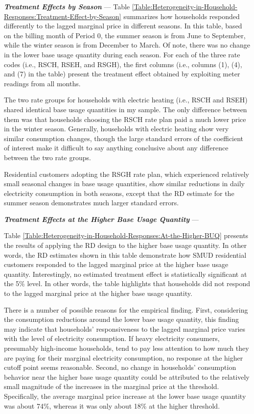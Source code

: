 \noindent
\textit{\textbf{Treatment Effects by Season}} --- 
Table \ref{Table:Heterogeneity-in-Household-Responses:Treatment-Effect-by-Season} summarizes how households responded differently to the lagged marginal price in different seasons. In this table, based on the billing month of Period 0, the summer season is from June to September, while the winter season is from December to March. Of note, there was no change in the lower base usage quantity during each season. For each of the three rate codes (i.e., RSCH, RSEH, and RSGH), the first columns (i.e., columns (1), (4), and (7) in the table) present the treatment effect obtained by exploiting meter readings from all months. 

The two rate groups for households with electric heating (i.e., RSCH and RSEH) shared identical base usage quantities in my sample. The only difference between them was that households choosing the RSCH rate plan paid a much lower price in the winter season. Generally, households with electric heating show very similar consumption changes, though the large standard errors of the coefficient of interest make it difficult to say anything conclusive about any difference between the two rate groups. 

Residential customers adopting the RSGH rate plan, which experienced relatively small seasonal changes in base usage quantities, show similar reductions in daily electricity consumption in both seasons, except that the RD estimate for the summer season demonstrates much larger standard errors. 


\par \vspace{0.5cm}
\noindent
\textit{\textbf{Treatment Effects at the Higher Base Usage Quantity}} ---

Table \ref{Table:Heterogeneity-in-Household-Responses:At-the-Higher-BUQ} presents the results of applying the RD design to the higher base usage quantity. In other words, the RD estimates shown in this table demonstrate how SMUD residential customers responded to the lagged marginal price at the higher base usage quantity. Interestingly, no estimated treatment effect is statistically significant at the 5\% level. In other words, the table highlights that households did not respond to the lagged marginal price at the higher base usage quantity. 

There is a number of possible reasons for the empirical finding. First, considering the consumption reductions around the lower base usage quantity, this finding may indicate that households' responsiveness to the lagged marginal price varies with the level of electricity consumption. If heavy electricity consumers, presumably high-income households, tend to pay less attention to how much they are paying for their marginal electricity consumption, no response at the higher cutoff point seems reasonable. Second, no change in households' consumption behavior near the higher base usage quantity could be attributed to the relatively small magnitude of the increases in the marginal price at the threshold. Specifically, the average marginal price increase at the lower base usage quantity was about 74\%, whereas it was only about 18\% at the higher threshold. 
